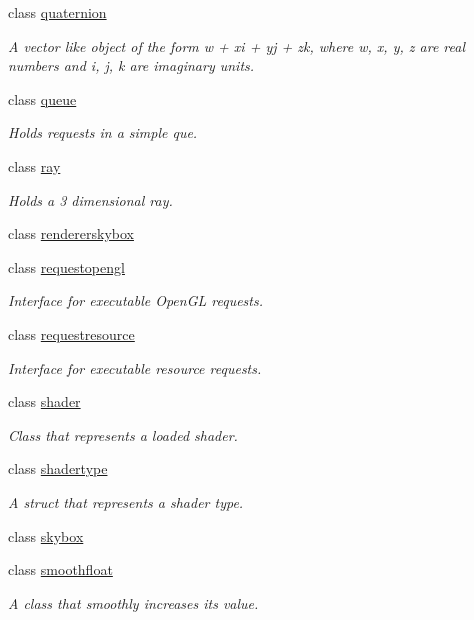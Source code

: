 \begin{DoxyCompactItemize}
class \hyperlink{classflounder_1_1quaternion}{quaternion}
\begin{DoxyCompactList}\small\item\em A vector like object of the form w + xi + yj + zk, where w, x, y, z are real numbers and i, j, k are imaginary units. \end{DoxyCompactList}\item 
class \hyperlink{classflounder_1_1queue}{queue}
\begin{DoxyCompactList}\small\item\em Holds requests in a simple que. \end{DoxyCompactList}\item 
class \hyperlink{classflounder_1_1ray}{ray}
\begin{DoxyCompactList}\small\item\em Holds a 3 dimensional ray. \end{DoxyCompactList}\item 
class \hyperlink{classflounder_1_1rendererskybox}{rendererskybox}
\item 
class \hyperlink{classflounder_1_1requestopengl}{requestopengl}
\begin{DoxyCompactList}\small\item\em Interface for executable Open\+GL requests. \end{DoxyCompactList}\item 
class \hyperlink{classflounder_1_1requestresource}{requestresource}
\begin{DoxyCompactList}\small\item\em Interface for executable resource requests. \end{DoxyCompactList}\item 
class \hyperlink{classflounder_1_1shader}{shader}
\begin{DoxyCompactList}\small\item\em Class that represents a loaded shader. \end{DoxyCompactList}\item 
class \hyperlink{classflounder_1_1shadertype}{shadertype}
\begin{DoxyCompactList}\small\item\em A struct that represents a shader type. \end{DoxyCompactList}\item 
class \hyperlink{classflounder_1_1skybox}{skybox}
\item 
class \hyperlink{classflounder_1_1smoothfloat}{smoothfloat}
\begin{DoxyCompactList}\small\item\em A class that smoothly increases its value. \end{DoxyCompactList}\item 

\end{DoxyCompactItemize}
